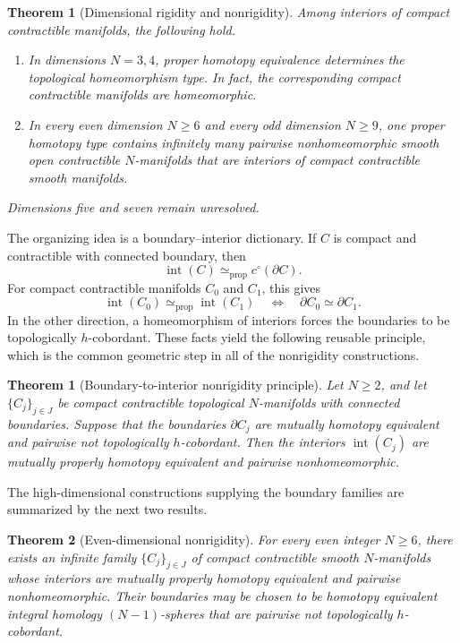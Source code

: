 \documentclass[10pt,reqno]{amsart}
\numberwithin{equation}{section}
\newtheorem{maintheorem}{Theorem}
\newtheorem{theorem}{Theorem}
\theoremstyle{definition}
\theoremstyle{remark}
\newcommand{\Int}{\operatorname{int}}
\newcommand{\simeqp}{\simeq_{\mathrm{prop}}}
\begin{document}
\begin{maintheorem}[Dimensional rigidity and nonrigidity]
\label{thm:main-classification}
Among interiors of compact contractible manifolds, the following hold.
\begin{enumerate}[label=\textup{(\roman*)}]
\item In dimensions \(N=3,4\), proper homotopy equivalence determines
the topological homeomorphism type.  In fact, the corresponding compact
contractible manifolds are homeomorphic.
\item In every even dimension \(N\geq6\) and every odd dimension
\(N\geq9\), one proper homotopy type contains infinitely many pairwise
nonhomeomorphic smooth open contractible \(N\)-manifolds that are
interiors of compact contractible smooth manifolds.
\end{enumerate}
Dimensions five and seven remain unresolved.
\end{maintheorem}

The organizing idea is a boundary--interior dictionary.  If \(C\) is
compact and contractible with connected boundary, then
\[
\Int(C)\simeqp c^\circ(\partial C).
\]
For compact contractible manifolds \(C_0\) and \(C_1\), this gives
\[
\Int(C_0)\simeqp\Int(C_1)
\quad\Longleftrightarrow\quad
\partial C_0\simeq\partial C_1.
\]
In the other direction, a homeomorphism of interiors forces the
boundaries to be topologically \(h\)-cobordant.  These facts yield the
following reusable principle, which is the common geometric step in
all of the nonrigidity constructions.

\begin{theorem}[Boundary-to-interior nonrigidity principle]
\label{thm:boundary-to-interior-transfer}
Let \(N\geq2\), and let \(\{C_j\}_{j\in J}\) be compact contractible
topological \(N\)-manifolds with connected boundaries.  Suppose that
the boundaries \(\partial C_j\) are mutually homotopy equivalent and
pairwise not topologically \(h\)-cobordant.  Then the interiors
\(\Int(C_j)\) are mutually properly homotopy equivalent and pairwise
nonhomeomorphic.
\end{theorem}

The high-dimensional constructions supplying the boundary families
are summarized by the next two results.

\begin{maintheorem}[Even-dimensional nonrigidity]
\label{thm:even-main}
For every even integer \(N\geq6\), there exists an infinite family
\(\{C_j\}_{j\in J}\) of compact contractible smooth \(N\)-manifolds
whose interiors are mutually properly homotopy equivalent and pairwise
nonhomeomorphic.  Their boundaries may be chosen to be homotopy
equivalent integral homology \((N-1)\)-spheres that are pairwise not
topologically \(h\)-cobordant.
\end{maintheorem}
\end{document}

